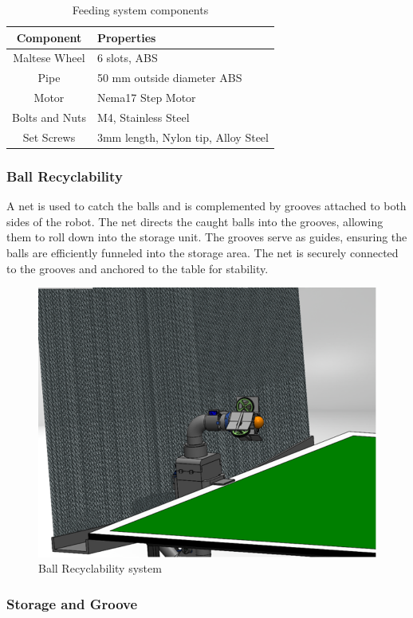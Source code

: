 \documentclass[12pt]{report}
\begin{document}
\begin{table}[h!]
\scriptsize
\centering
\caption{Feeding system components}
\begin{tabular}{|c|p{6cm}|}
\hline
\textbf{Component} & \textbf{Properties} \\ \hline
Maltese Wheel & 6 slots, ABS \\ \hline
Pipe & 50 mm outside diameter ABS \\ \hline
Motor & Nema17 Step Motor \\ \hline
Bolts and Nuts & M4, Stainless Steel \\ \hline
Set Screws & 3mm length, Nylon tip, Alloy Steel \\ \hline
\end{tabular}
\label{table:feeding_components}
\end{table}


\subsubsection{Ball Recyclability}

A net is used to catch the balls and is complemented by grooves attached to both sides of the robot. The net directs the caught balls into the grooves, allowing them to roll down into the storage unit. The grooves serve as guides, ensuring the balls are efficiently funneled into the storage area. The net is securely connected to the grooves and anchored to the table for stability.

\begin{figure}[h!]
    \centering
    \includegraphics[width=0.5\linewidth]{2.3.5.1.png}
    \caption{Ball Recyclability system}
    \label{fig:enter-label}
\end{figure}

\subsubsection{Storage and Groove}
\end{document}
